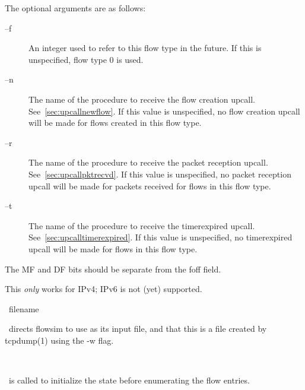 \documentclass{article}
\begin{document}
The optional arguments are as follows:

\begin{description}
\item[--f] An integer used to refer to this flow type in the future.
If this is unspecified, flow type 0 is used.
\item[--n] The name of the procedure to receive the flow creation
upcall.  See~\ref{sec:upcallnewflow}.  If
this value is unspecified, no flow creation upcall will be made for
flows created in this flow type.
\item[--r] The name of the procedure to receive the packet reception
upcall.  See~\ref{sec:upcallpktrecvd}.  If this value is unspecified,
no packet reception upcall will be made for packets received for flows
in this flow type.
\item[--t] The name of the procedure to receive the timerexpired upcall.
See~\ref{sec:upcalltimerexpired}.  If this value is unspecified,
no timerexpired upcall will be made for flows in this flow type.
\end{description}

\BUGS

The MF and DF bits should be separate from the foff field.

This \emph{only} works for IPv4; IPv6 is not (yet) supported.

\manend


\SYNOPSIS \cmdname\ filename

\DESCRIPTION

\cmdname\ directs flowsim to use  as
its input file, and that this is a file created by tcpdump(1) using the
-w flag.

\SEEALSO


\manend


\SYNOPSIS \cmdname\

\DESCRIPTION

\cmdname\ is called to initialize the state before enumerating the flow
entries.

\SEEALSO


\manend

\end{document}
